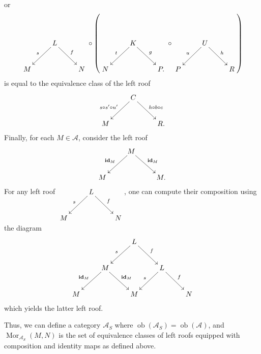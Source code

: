 \documentclass[11pt]{article}
\theoremstyle{thmstyle}
\theoremstyle{defstyle}
\newcommand{\id}{\mathbf{id}}
\newcommand{\scrA}{\mathscr{A}}
\newcommand{\Mor}{\operatorname{Mor}}
\begin{document}
or 
\begin{equation*}
	\xymatrix {
		& L\ar[ld]_s\ar[rd]^f & \\
		M & & N
	}
	\circ
	\left(
	\xymatrix {
		& K\ar[ld]_t\ar[rd]^g & \\
		N & & P.
	}
	\circ
	\xymatrix { 
		& U\ar[ld]_u\ar[rd]^h &\\
		P & & R
	}
	\right)
\end{equation*}
is equal to the equivalence class of the left roof 
\begin{equation*}
	\xymatrix {
		& C\ar[ld]_{s\circ s'\circ u'}\ar[rd]^{h\circ b\circ c} & \\
		M & & R.
	}
\end{equation*}
Finally, for each $M\in\scrA$, consider the left roof 
\begin{equation*}
	\xymatrix {
		& M\ar[ld]_{\id_M}\ar[rd]^{\id_M} & \\
		M & & M.
	}
\end{equation*}
For any left roof $\xymatrix { & L\ar[ld]_s\ar[rd]^f & \\ M & & N }$, one can compute their composition using the diagram 
\begin{equation*}
	\xymatrix {
		& & L\ar[ld]_s\ar[rd]^f & & \\
		& M\ar[ld]_{\id_M}\ar[rd]^{\id_M} & & L\ar[ld]_s\ar[rd]^f & \\
		M & & M & & N
	}
\end{equation*}
which yields the latter left roof.

\begin{mdframed}
Thus, we can define a category $\scrA_S$ where $\operatorname{ob}(\scrA_S) = \operatorname{ob}(\scrA)$, and $\Mor_{\scrA_S}(M, N)$ is the set of equivalence classes of left roofs equipped with composition and identity maps as defined above. 
\end{mdframed}
\end{document}
